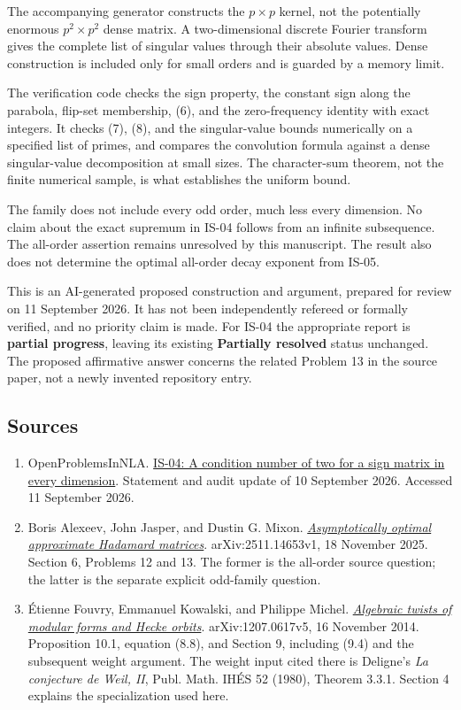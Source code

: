 \documentclass[
  11pt,
]{article}
\begin{document}
The accompanying generator constructs the \(p\times p\) kernel, not the
potentially enormous \(p^2\times p^2\) dense matrix. A two-dimensional
discrete Fourier transform gives the complete list of singular values
through their absolute values. Dense construction is included only for
small orders and is guarded by a memory limit.

The verification code checks the sign property, the constant sign along
the parabola, flip-set membership, (6), and the zero-frequency identity
with exact integers. It checks (7), (8), and the singular-value bounds
numerically on a specified list of primes, and compares the convolution
formula against a dense singular-value decomposition at small sizes. The
character-sum theorem, not the finite numerical sample, is what
establishes the uniform bound.

The family does not include every odd order, much less every dimension.
No claim about the exact supremum in IS-04 follows from an infinite
subsequence. The all-order assertion remains unresolved by this
manuscript. The result also does not determine the optimal all-order
decay exponent from IS-05.

This is an AI-generated proposed construction and argument, prepared for
review on 11 September 2026. It has not been independently refereed or
formally verified, and no priority claim is made. For IS-04 the
appropriate report is \textbf{partial progress}, leaving its existing
\textbf{Partially resolved} status unchanged. The proposed affirmative
answer concerns the related Problem 13 in the source paper, not a newly
invented repository entry.

\subsection{Sources}\label{sources}

\begin{enumerate}
\def\labelenumi{\arabic{enumi}.}
\item
  OpenProblemsInNLA.
  \href{https://github.com/ajt60gaibb/OpenProblemsInNLA/blob/main/eigenvalues-and-inverse-problems/IS-04/README.md}{IS-04:
  A condition number of two for a sign matrix in every dimension}.
  Statement and audit update of 10 September 2026. Accessed 11 September
  2026.
\item
  Boris Alexeev, John Jasper, and Dustin G. Mixon.
  \href{https://arxiv.org/html/2511.14653v1}{\emph{Asymptotically
  optimal approximate Hadamard matrices}}. arXiv:2511.14653v1, 18
  November 2025. Section 6, Problems 12 and 13. The former is the
  all-order source question; the latter is the separate explicit
  odd-family question.
\item
  Étienne Fouvry, Emmanuel Kowalski, and Philippe Michel.
  \href{https://arxiv.org/html/1207.0617v5}{\emph{Algebraic twists of
  modular forms and Hecke orbits}}. arXiv:1207.0617v5, 16 November 2014.
  Proposition 10.1, equation (8.8), and Section 9, including (9.4) and
  the subsequent weight argument. The weight input cited there is
  Deligne's \emph{La conjecture de Weil, II}, Publ. Math. IHÉS 52
  (1980), Theorem 3.3.1. Section 4 explains the specialization used
  here.
\end{enumerate}
\end{document}
